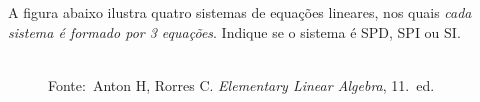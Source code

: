 \documentclass[pdftex, brazil, 12pt, oneside, addpoints]{exam}
\newcommand{\vf}[1][{}]{%
  \fillin[#1][0.25in]%
}
\begin{document}
\begin{questions}

\question
A figura abaixo ilustra quatro sistemas de
equações lineares, nos quais \emph{cada sistema é formado por 3
equações}. Indique se o sistema é SPD, SPI ou SI.
\begin{figure}[H]
  \begin{center}
    \\
    \footnotesize{Fonte:~Anton H, Rorres C. \emph{Elementary Linear Algebra}, 11.\ ed.}
  \end{center}
\end{figure}
\vspace{-0.5cm}


\end{questions}
\end{document}

